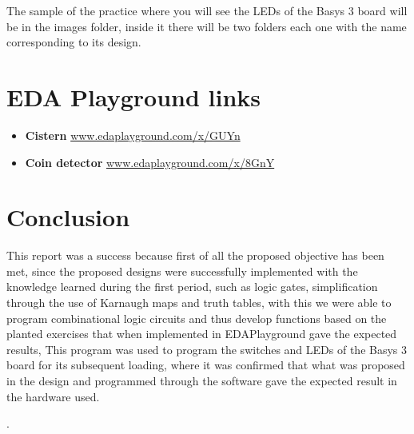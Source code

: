 \documentclass{article}
\begin{document}
\begin{multicols}{2}
The sample of the practice where you will see the LEDs of the Basys 3 board will be in the images folder, inside it there will be two folders each one with the name corresponding to its design.



\section*{EDA Playground links}
\begin{itemize}
    \item \textbf{Cistern} \url{www.edaplayground.com/x/GUYn}
    \item \textbf{Coin detector} \url{www.edaplayground.com/x/8GnY}
\end{itemize}
\section*{Conclusion}
This report was a success because first of all the proposed objective has been met, since the proposed designs were successfully implemented with the knowledge learned during the first period, such as logic gates, simplification through the use of Karnaugh maps and truth tables, with this we were able to program combinational logic circuits and thus develop functions based on the planted exercises that when implemented in EDAPlayground gave the expected results, This program was used to program the switches and LEDs of the Basys 3 board for its subsequent loading, where it was confirmed that what was proposed in the design and programmed through the software gave the expected result in the hardware used.

. \raggedcolumns
    

\newpage
 


\end{multicols}
\end{document}
